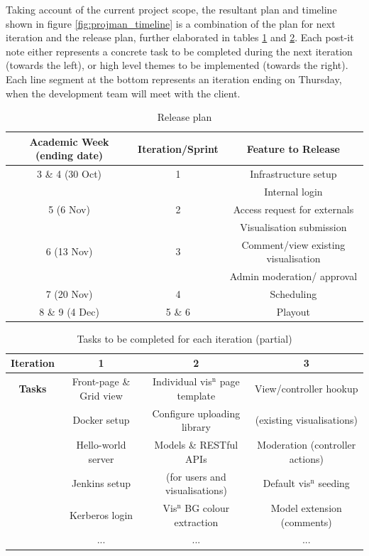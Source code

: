 \documentclass[a4paper, titlepage]{article}
\begin{document}
Taking account of the current project scope, the resultant plan and timeline shown in figure 
\ref{fig:projman_timeline} is a
combination of the plan for next iteration and the release plan, further elaborated in tables 
\ref{tab:projman_rplan} and \ref{tab:projman_iplan}. Each post-it note either represents a 
concrete task to be completed during the next iteration (towards the left), or
high level themes to be implemented (towards the right). Each line segment at
the bottom represents an iteration ending on Thursday, when the development
team will meet with the client.

\begin{table}[h]
  \begin{center}
  \begin{tabular}{c | c | c}
     \textbf{Academic Week (ending date)} & \textbf{Iteration/Sprint} & \textbf{Feature to Release} \\ \hline
     3 \& 4 (30 Oct) & 1 & Infrastructure setup \\
      & & Internal login \\
     5 (6 Nov) & 2 & Access request for externals \\
      & & Visualisation submission \\
     6 (13 Nov) & 3 & Comment/view existing visualisation \\
      & & Admin moderation/ approval \\
     7 (20 Nov) & 4 & Scheduling \\
     8 \& 9 (4 Dec) & 5 \& 6 & Playout \\
  \end{tabular}
  \end{center}
  \caption{Release plan}
  \label{tab:projman_rplan}
\end{table}

\begin{table}[h]
  \begin{tabular}{c | c | c | c }
    \textbf{Iteration} & 1 & 2 & 3 \\ \hline
   \textbf{Tasks} & Front-page \& Grid view & Individual vis$^\textrm{n}$ page template & View/controller hookup\\
      & Docker setup & Configure uploading library & (existing visualisations)\\
      & Hello-world server & Models \& RESTful APIs& Moderation (controller actions)\\
      & Jenkins setup & (for users and visualisations)& Default vis$^\textrm{n}$ seeding\\
      & Kerberos login& Vis$^\textrm{n}$ BG colour extraction & Model extension (comments)\\
      & ... & ... & ...
  \end{tabular}
  \caption{Tasks to be completed for each iteration (partial)}
  \label{tab:projman_iplan}
\end{table}
\end{document}
